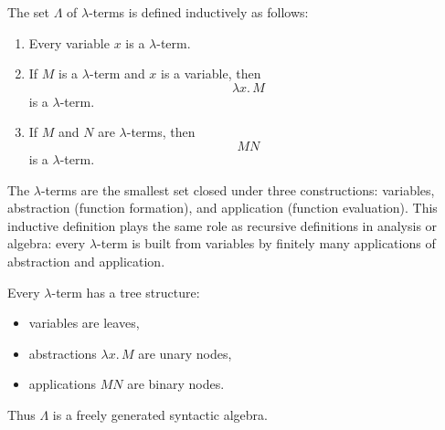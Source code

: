 
\begin{tcolorbox}[title={Definition --- Lambda Terms}]
\begin{definition}
The set $\Lambda$ of $\lambda$-terms is defined inductively as follows:

\begin{enumerate}
    \item Every variable $x$ is a $\lambda$-term.
    \item If $M$ is a $\lambda$-term and $x$ is a variable, then
    \[
    \lambda x.\,M
    \]
    is a $\lambda$-term.
    \item If $M$ and $N$ are $\lambda$-terms, then
    \[
    MN
    \]
    is a $\lambda$-term.
\end{enumerate}
\end{definition}
\end{tcolorbox}

\begin{remark*}[Interpretation]
The $\lambda$-terms are the smallest set closed under three constructions:
variables, abstraction (function formation), and application (function
evaluation). This inductive definition plays the same role as recursive
definitions in analysis or algebra: every $\lambda$-term is built from
variables by finitely many applications of abstraction and application.
\end{remark*}

\begin{remark*}
Every $\lambda$-term has a tree structure:
\begin{itemize}
    \item variables are leaves,
    \item abstractions $\lambda x.\,M$ are unary nodes,
    \item applications $MN$ are binary nodes.
\end{itemize}
Thus $\Lambda$ is a freely generated syntactic algebra.
\end{remark*}